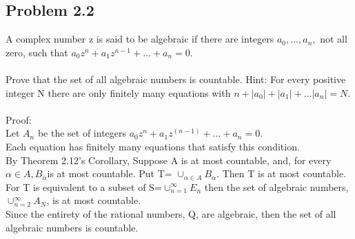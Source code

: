 \subsection{Problem 2.2}
A complex number z is said to be algebraic if there are integers $a_0, \dots, a_n,$ not all zero, such that $a_0 z^n + a_1 z^{n-1}+ \dots + a_n=0.$ \\ 
\\
Prove that the set of all algebraic numbers is countable. Hint: For every positive integer N there are only finitely many equations with $n+|a_0|+|a_1| + \dots |a_n|= N.$\\ 
\\
Proof:\\ 
Let $A_n$ be the set of integers $a_0 z^n + a_1 z^(n-1)+ \dots + a_n=0.$ \\ 
Each equation has finitely many equations that satisfy this condition. \\ 
By Theorem 2.12's Corollary, Suppose A is at most countable, and, for every $\alpha \in A, B_\alpha$is at most countable. Put T= $ \cup_{\alpha \in A}B_\alpha.$ Then T is at most countable. For T is equivalent to a subset of S=$\cup_{n=1}^\infty E_n$ then the set of algebraic numbers, $\cup_{n=2}^\infty A_N$, is at most countable. \\ 
Since the entirety of the rational numbers, Q, are algebraic, then the set of all algebraic numbers is countable. 


\begin{figure}[ht]\end{figure} 
